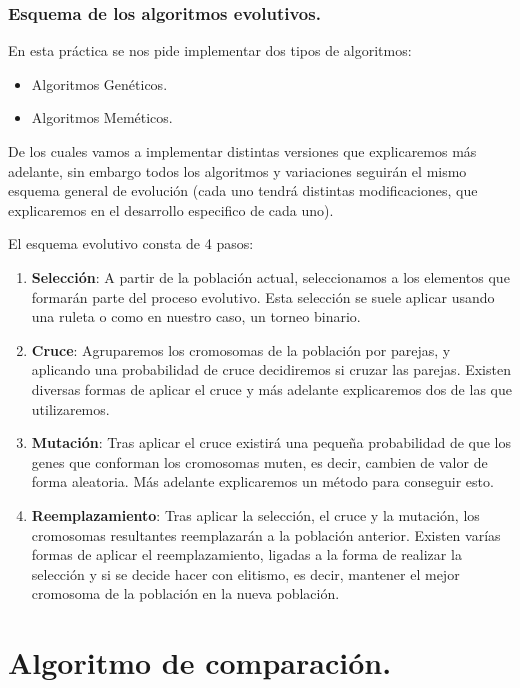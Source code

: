 \documentclass[12pt, spanish]{article}
\begin{document}
\subsubsection{Esquema de los algoritmos evolutivos.}

En esta práctica se nos pide implementar dos tipos de algoritmos:

\begin{itemize}
	\item {Algoritmos Genéticos.}
	\item {Algoritmos Meméticos.}
\end{itemize}

De los cuales vamos a implementar distintas versiones que explicaremos más adelante, sin embargo todos los algoritmos y variaciones seguirán el mismo esquema general de evolución (cada uno tendrá distintas modificaciones, que explicaremos en el desarrollo especifico de cada uno).

\newpage

El esquema evolutivo consta de 4 pasos:

\begin{enumerate}
	\item \textbf{Selección}: A partir de la población actual, seleccionamos a los elementos que formarán parte del proceso evolutivo. Esta selección se suele aplicar usando una ruleta o como en nuestro caso, un torneo binario.
	\item \textbf{Cruce}: Agruparemos los cromosomas de la población por parejas, y aplicando una probabilidad de cruce decidiremos si cruzar las parejas. Existen diversas formas de aplicar el cruce y más adelante explicaremos dos de las que utilizaremos.
	\item \textbf{Mutación}: Tras aplicar el cruce existirá una pequeña probabilidad de que los genes que conforman los cromosomas muten, es decir, cambien de valor de forma aleatoria. Más adelante explicaremos un método para conseguir esto.
	\item \textbf{Reemplazamiento}: Tras aplicar la selección, el cruce y la mutación, los cromosomas resultantes reemplazarán a la población anterior. Existen varías formas de aplicar el reemplazamiento, ligadas a la forma de realizar la selección y si se decide hacer con elitismo, es decir, mantener el mejor cromosoma de la población en la nueva población.
\end{enumerate}


\section{Algoritmo de comparación.}
\end{document}
